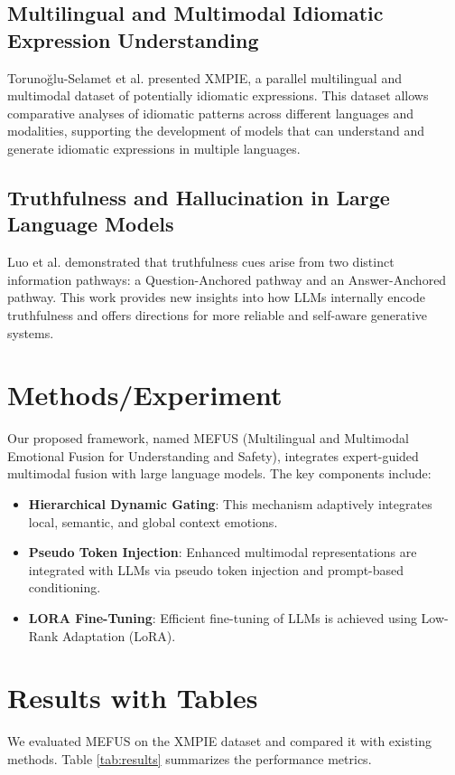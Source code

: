 \documentclass{article}
\begin{document}
\subsection{Multilingual and Multimodal Idiomatic Expression Understanding}
Torunoğlu-Selamet et al. \cite{torunoğluselamet2026parallelcrosslingualbenchmarkmultimodal} presented XMPIE, a parallel multilingual and multimodal dataset of potentially idiomatic expressions. This dataset allows comparative analyses of idiomatic patterns across different languages and modalities, supporting the development of models that can understand and generate idiomatic expressions in multiple languages.

\subsection{Truthfulness and Hallucination in Large Language Models}
Luo et al. \cite{luo2026pathwaystruthfulnessintrinsicencoding} demonstrated that truthfulness cues arise from two distinct information pathways: a Question-Anchored pathway and an Answer-Anchored pathway. This work provides new insights into how LLMs internally encode truthfulness and offers directions for more reliable and self-aware generative systems.

\section{Methods/Experiment}
Our proposed framework, named MEFUS (Multilingual and Multimodal Emotional Fusion for Understanding and Safety), integrates expert-guided multimodal fusion with large language models. The key components include:
\begin{itemize}
    \item \textbf{Hierarchical Dynamic Gating}: This mechanism adaptively integrates local, semantic, and global context emotions.
    \item \textbf{Pseudo Token Injection}: Enhanced multimodal representations are integrated with LLMs via pseudo token injection and prompt-based conditioning.
    \item \textbf{LORA Fine-Tuning}: Efficient fine-tuning of LLMs is achieved using Low-Rank Adaptation (LoRA).
\end{itemize}

\section{Results with Tables}
We evaluated MEFUS on the XMPIE dataset and compared it with existing methods. Table \ref{tab:results} summarizes the performance metrics.
\end{document}
